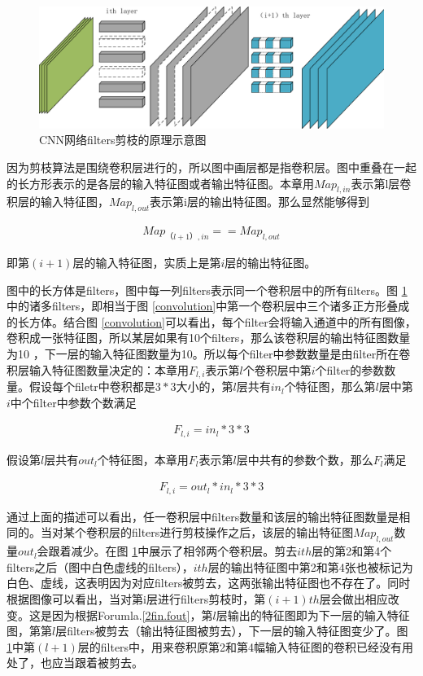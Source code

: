 \documentclass[ pdftex, oneside, master]{NJUthesis}
\begin{document}
\begin{figure}
\centering
\includegraphics[width=\textwidth]{filters_pruning.pdf}
\caption{CNN网络filters剪枝的原理示意图}
\label{filters_pruning}
\end{figure}

因为剪枝算法是围绕卷积层进行的，所以图中画层都是指卷积层。图中重叠在一起的长方形表示的是各层的输入特征图或者输出特征图。本章用$Map_{l,in}$表示第l层卷积层的输入特征图，$Map_{l,out}$表示第i层的输出特征图。那么显然能够得到

\begin{eqnarray}
Map_{（l+1）,in} == Map_{l,out}
\label{2fin.fout}
\end{eqnarray}

即第$(i+1)$层的输入特征图，实质上是第$i$层的输出特征图。

图中的长方体是filters，图中每一列filters表示同一个卷积层中的所有filters。图 \ref{filters_pruning}中的诸多filters，即相当于图 \ref{convolution}中第一个卷积层中三个诸多正方形叠成的长方体。结合图 \ref{convolution}可以看出，每个filter会将输入通道中的所有图像，卷积成一张特征图，所以某层如果有10个filters，那么该卷积层的输出特征图数量为10 ，下一层的输入特征图数量为10。所以每个filter中参数数量是由filter所在卷积层输入特征图数量决定的：本章用$F_{l,i}$表示第$l$个卷积层中第$i$个filter的参数数量。假设每个filetr中卷积都是$3*3$大小的，第$l$层共有$in_{l}$个特征图，那么第$l$层中第$i$中个filter中参数个数满足

\begin{eqnarray}
F_{l,i} = in_{l}*3*3
\end{eqnarray}

假设第$l$层共有$out_{l}$个特征图，本章用$F_l$表示第$l$层中共有的参数个数，那么$F_l$满足

\begin{eqnarray}
F_{l,i} = out_{l}*in_{l}*3*3
\end{eqnarray}

通过上面的描述可以看出，任一卷积层中filters数量和该层的输出特征图数量是相同的。当对某个卷积层的filters进行剪枝操作之后，该层的输出特征图$Map_{l,out}$数量$out_{l}$会跟着减少。在图 \ref{filters_pruning}中展示了相邻两个卷积层。剪去$ith$层的第2和第4个filters之后（图中白色虚线的filters），$ith$层的输出特征图中第2和第4张也被标记为白色、虚线，这表明因为对应filters被剪去，这两张输出特征图也不存在了。同时根据图像可以看出，当对第i层进行filters剪枝时，第$(i+1)th$层会做出相应改变。这是因为根据Forumla.\ref{2fin.fout}，第$l$层输出的特征图即为下一层的输入特征图，第第$l$层filters被剪去（输出特征图被剪去），下一层的输入特征图变少了。图 \ref{filters_pruning}中第$(l+1)$层的filters中，用来卷积原第2和第4幅输入特征图的卷积已经没有用处了，也应当跟着被剪去。
\end{document}
